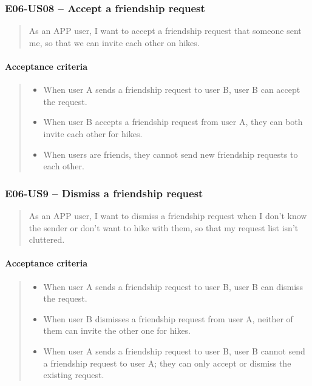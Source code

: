 \subsubsection*{E06-US08 -- Accept a friendship request}
\begin{quote}
As an APP user, I want to accept a friendship request that someone sent me, so that we can invite each other on hikes.
\end{quote}

\paragraph*{Acceptance criteria}
\begin{quote}
\begin{itemize}
    \item When user A sends a friendship request to user B, user B can accept the request.
    \item When user B accepts a friendship request from user A, they can both invite each other for hikes.
    \item When users are friends, they cannot send new friendship requests to each other.
\end{itemize}
\end{quote}


\subsubsection*{E06-US9 -- Dismiss a friendship request}
\begin{quote}
As an APP user, I want to dismiss a friendship request when I don't know the sender or don't want to hike with them, so that my request list isn't cluttered.
\end{quote}

\paragraph*{Acceptance criteria} 
\begin{quote}
\begin{itemize}
    \item When user A sends a friendship request to user B, user B can dismiss the request.
    \item When user B dismisses a friendship request from user A, neither of them can invite the other one for hikes.
    \item When user A sends a friendship request to user B, user B cannot send a friendship request to user A; they can only accept or dismiss the existing request.
\end{itemize}
\end{quote}


